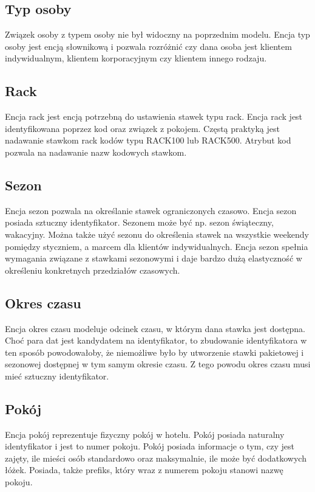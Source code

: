 \documentclass[a4paper,onecolumn,oneside,11pt,wide,floatssmall]{mwrep}
\theoremstyle{definition}
\theoremstyle{plain}%
\theoremstyle{remark}
\begin{document}
\subsection{Typ osoby}
Związek osoby z typem osoby nie był widoczny na poprzednim modelu. Encja typ osoby jest encją słownikową i pozwala rozróżnić czy dana osoba jest klientem indywidualnym, klientem korporacyjnym czy klientem innego rodzaju. 

\subsection{Rack}
Encja rack jest encją potrzebną do ustawienia stawek typu rack. Encja rack jest identyfikowana poprzez kod oraz związek z pokojem. Częstą praktyką jest nadawanie stawkom rack kodów typu RACK100 lub RACK500. Atrybut kod pozwala na nadawanie nazw kodowych stawkom.

\subsection{Sezon}
Encja sezon pozwala na określanie stawek ograniczonych czasowo. Encja sezon posiada sztuczny identyfikator. Sezonem może być np. sezon świąteczny, wakacyjny. Można także użyć sezonu do określenia stawek na wszystkie weekendy pomiędzy styczniem, a marcem dla klientów indywidualnych. Encja sezon spełnia wymagania związane z stawkami sezonowymi i daje bardzo dużą elastyczność w określeniu konkretnych przedziałów czasowych.

\subsection{Okres czasu}
Encja okres czasu modeluje odcinek czasu, w którym dana stawka jest dostępna. Choć para dat jest kandydatem na identyfikator, to zbudowanie identyfikatora w ten sposób powodowałoby, że niemożliwe było by utworzenie stawki pakietowej i sezonowej dostępnej w tym samym okresie czasu. Z tego powodu okres czasu musi mieć sztuczny identyfikator.

\subsection{Pokój}
Encja pokój reprezentuje fizyczny pokój w hotelu. Pokój posiada naturalny identyfikator i jest to numer pokoju. Pokój posiada informacje o tym, czy jest zajęty, ile mieści osób standardowo oraz maksymalnie, ile może być dodatkowych łóżek. Posiada, także prefiks, który wraz z numerem pokoju stanowi nazwę pokoju.
\end{document}
